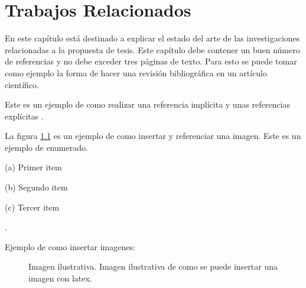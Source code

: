 \chapter{Trabajos Relacionados}
\label{chap:cha3}

En este capítulo está destinado a explicar el estado del arte de las investigaciones relacionadas a la propuesta de tesis.
Este capítulo debe contener un buen número de referencias y no debe exceder tres páginas de texto. Para esto se puede tomar como ejemplo la forma de hacer una revisión bibliográfica en un artículo científico.

Este es un ejemplo de como realizar una referencia implícita \citep{Yasmin2015} y unas referencias explícitas \citet{Furini2008, Avila2011}.


La figura \ref{fig:Pipeline2} es un ejemplo de como insertar y referenciar una imagen.
Este es un ejemplo de enumerado.


\begin{enumerate*}
\item[(a)] Primer item
\item[(b)] Segundo item
\item[(c)] Tercer item
\end{enumerate*}.


Ejemplo de como insertar imagenes:
  \begin{figure}
  \centering
  \caption[Imagen ilustrativa.]
  {Imagen ilustrativa. Imagen ilustrativa de como se puede insertar una imagen con latex.}
  \label{fig:Pipeline2}
  \end{figure}






